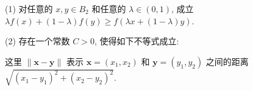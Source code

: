 (1) 对任意的 $x, y \in B_2$ 和任意的 $\lambda \in (0, 1)$, 成立 $\lambda f(x) + (1 - \lambda)f(y) \geq f(\lambda x + (1 - \lambda)y)$.\par
\par{}
(2) 存在一个常数 $C > 0$, 使得如下不等式成立:\par
\nopagebreak[4]
这里 $\| \pmb {x} - \pmb{y}\|$ 表示 $\pmb {x} = (x_1,x_2)$ 和 $\pmb {y} = (y_{1},y_{2})$ 之间的距离 $\sqrt{(x_1 - y_1)^2 + (x_2 - y_2)^2}.$\par
